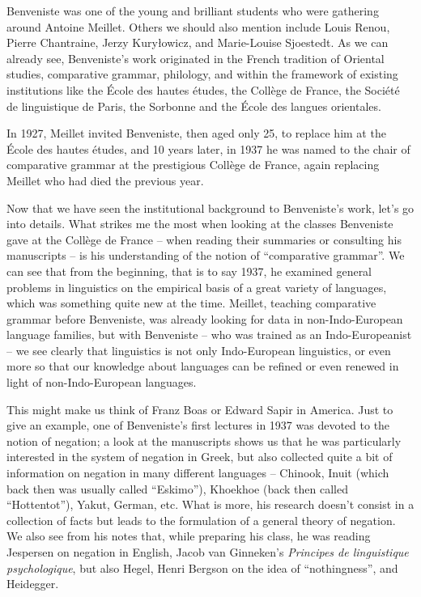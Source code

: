 \documentclass[output=paper]{langscibook}
\begin{document}
Benveniste was one of the young and brilliant students who were gathering around Antoine Meillet. Others we should also mention include Louis Renou, Pierre Chantraine, Jerzy Kuryłowicz, and Marie-Louise Sjoestedt. As we can already see, Benveniste’s work originated in the French tradition of Oriental studies, comparative grammar, philology, and within the framework of existing institutions like the École des hautes études, the Collège de France, the Société de linguistique de Paris, the Sorbonne and the École des langues orientales.

In 1927, Meillet invited Benveniste, then aged only 25, to replace him at the École des hautes études, and 10 years later, in 1937 he was named to the chair of comparative grammar at the prestigious Collège de France, again replacing Meillet who had died the previous year.

Now that we have seen the institutional background to Benveniste’s work, let’s go into details. What strikes me the most when looking at the classes Benveniste gave at the Collège de France – when reading their summaries or consulting his manuscripts – is his understanding of the notion of “comparative grammar”. We can see that from the beginning, that is to say 1937, he examined general problems in linguistics on the empirical basis of a great variety of languages, which was something quite new at the time. Meillet, teaching comparative grammar before Benveniste, was already looking for data in non-Indo-European language families, but with Benveniste – who was trained as an Indo-Europeanist – we see clearly that linguistics is not only Indo-European linguistics, or even more so that our knowledge about languages can be refined or even renewed in light of non-Indo-European languages. 

This might make us think of Franz Boas or Edward Sapir in America. Just to give an example, one of Benveniste’s first lectures in 1937 was devoted to the notion of negation; a look at the manuscripts shows us that he was particularly interested in the system of negation in Greek, but also collected quite a bit of information on negation in many different languages – Chinook, Inuit (which back then was usually called “Eskimo”), Khoekhoe (back then called “Hottentot”), Yakut, German, etc. What is more, his research doesn’t consist in a collection of facts but leads to the formulation of a general theory of negation.  We also see from his notes that, while preparing his class, he was reading Jespersen on negation in English, Jacob van Ginneken’s \textit{Principes de linguistique psychologique}, but also Hegel, Henri Bergson on the idea of “nothingness”, and Heidegger.
\end{document}
